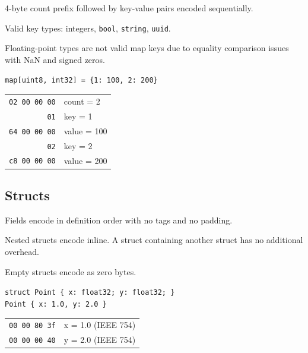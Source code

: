 \documentclass[10pt,onecolumn]{article}
\begin{document}
\begin{minipage}[t]{0.48\textwidth}
\raggedright
4-byte count prefix followed by key-value pairs encoded sequentially.

\vspace{6pt}
Valid key types: integers, \texttt{bool}, \texttt{string}, \texttt{uuid}.

\vspace{6pt}
Floating-point types are not valid map keys due to equality comparison issues with NaN and signed zeros.
\end{minipage}\hfill
\begin{minipage}[t]{0.48\textwidth}
\small
\texttt{map[uint8, int32] = \{1: 100, 2: 200\}}
\vspace{4pt}

\begin{tabular}[t]{@{}r@{\quad}l@{}}
\texttt{02 00 00 00} & count = 2 \\
\texttt{01} & key = 1 \\
\texttt{64 00 00 00} & value = 100 \\
\texttt{02} & key = 2 \\
\texttt{c8 00 00 00} & value = 200 \\
\end{tabular}
\end{minipage}


\subsection{Structs}
\label{sec:wire-structs}

\begin{minipage}[t]{0.48\textwidth}
Fields encode in definition order with no tags and no padding.

\vspace{6pt}
Nested structs encode inline. A struct containing another struct has no additional overhead.

\vspace{6pt}
Empty structs encode as zero bytes.
\end{minipage}\hfill
\begin{minipage}[t]{0.48\textwidth}
\small\raggedright
\texttt{struct Point \{ x: float32; y: float32; \}}\\
\texttt{Point \{ x: 1.0, y: 2.0 \}}
\vspace{4pt}

\begin{tabular}[t]{@{}r@{\quad}l@{}}
\texttt{00 00 80 3f} & x = 1.0 (IEEE 754) \\
\texttt{00 00 00 40} & y = 2.0 (IEEE 754) \\
\end{tabular}
\end{minipage}
\end{document}
